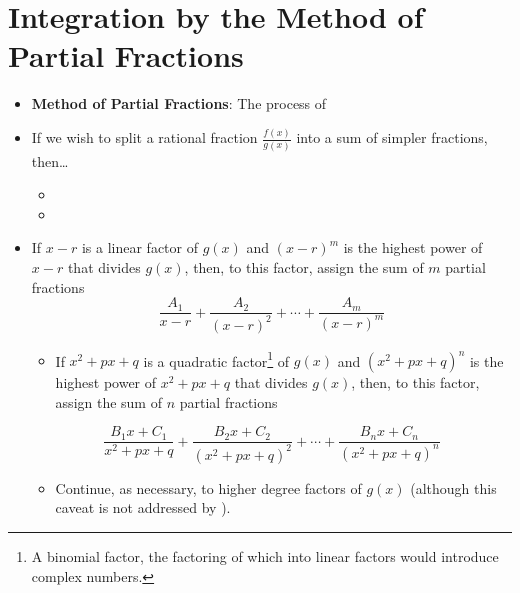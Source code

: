 \documentclass[../main.tex]{subfiles}
\begin{document}
\section{Integration by the Method of Partial Fractions}
\begin{itemize}
    \item {}\textbf{Method of Partial Fractions}: The process of 
    \item If we wish to split a rational fraction $\frac{f(x)}{g(x)}$ into a sum of simpler fractions, then\dots
    \begin{itemize}
        \item {}
        \item {}
    \end{itemize}
    \item If $x-r$ is a linear factor of $g(x)$ and $(x-r)^m$ is the highest power of $x-r$ that divides $g(x)$, then, to this factor, assign the sum of $m$ partial fractions
    \begin{equation*}
        \frac{A_1}{x-r}+\frac{A_2}{(x-r)^2}+\cdots+\frac{A_m}{(x-r)^m}
    \end{equation*}
    \begin{itemize}
        \item If $x^2+px+q$ is a quadratic factor\footnote{A binomial factor, the factoring of which into linear factors would introduce complex numbers.} of $g(x)$ and $\left( x^2+px+q \right)^n$ is the highest power of $x^2+px+q$ that divides $g(x)$, then, to this factor, assign the sum of $n$ partial fractions
    \end{itemize}
    \begin{equation*}
        \frac{B_1x+C_1}{x^2+px+q}+\frac{B_2x+C_2}{\left( x^2+px+q \right)^2}+\cdots+\frac{B_nx+C_n}{\left( x^2+px+q \right)^n}
    \end{equation*}
    \begin{itemize}
        \item Continue, as necessary, to higher degree factors of $g(x)$ (although this caveat is not addressed by \textcite{bib:Thomas}).

\end{itemize}
\end{itemize}
\end{document}
